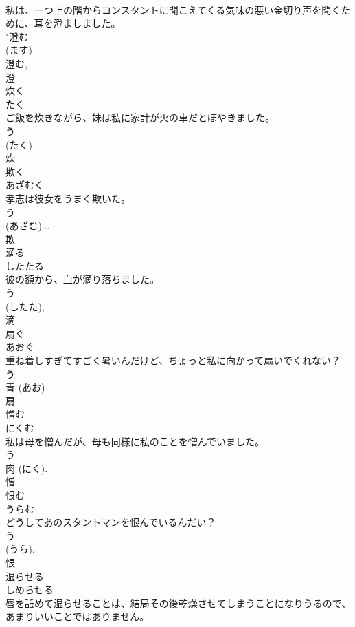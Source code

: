 \documentclass[8pt]{extreport}
\begin{document}
\begin{CJK}{UTF8}{min}
\\	私は、一つ上の階からコンスタントに聞こえてくる気味の悪い金切り声を聞くために、耳を澄ましました。	
\\	"澄む 
\\	(ます) 
\\	澄む, 
\\	澄	
\\	炊く	
\\	たく	
\\	ご飯を炊きながら、妹は私に家計が火の車だとぼやきました。	
\\	う 
\\	(たく) 
\\	炊	
\\	欺く	
\\	あざむく	
\\	孝志は彼女をうまく欺いた。	
\\	う 
\\	(あざむ)... 
\\	欺	
\\	滴る	
\\	したたる	
\\	彼の額から、血が滴り落ちました。	
\\	う 
\\	(したた), 
\\	滴	
\\	扇ぐ	
\\	あおぐ	
\\	重ね着しすぎてすごく暑いんだけど、ちょっと私に向かって扇いでくれない？	
\\	う 
\\	青 (あお) 
\\	扇	
\\	憎む	
\\	にくむ	
\\	私は母を憎んだが、母も同様に私のことを憎んでいました。	
\\	う 
\\	肉 (にく). 
\\	憎	
\\	恨む	
\\	うらむ	
\\	どうしてあのスタントマンを恨んでいるんだい？	
\\	う 
\\	(うら). 
\\	恨	
\\	湿らせる	
\\	しめらせる	
\\	唇を舐めて湿らせることは、結局その後乾燥させてしまうことになりうるので、あまりいいことではありません。	

\end{CJK}
\end{document}
